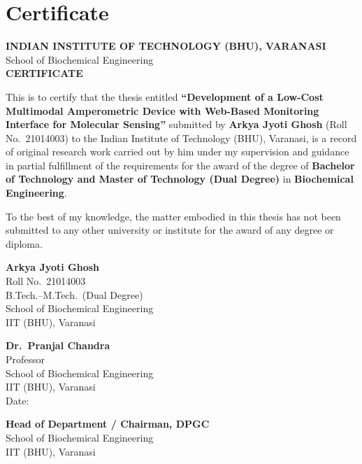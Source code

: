 \chapter*{Certificate}
\thispagestyle{plain}

\begin{center}
{\large \textbf{INDIAN INSTITUTE OF TECHNOLOGY (BHU), VARANASI}}\\[0.2cm]
{\normalsize School of Biochemical Engineering}\\[1.0cm]
{\Large \textbf{CERTIFICATE}}
\end{center}

\vspace{0.8cm}

This is to certify that the thesis entitled \textbf{``Development of a Low-Cost Multimodal Amperometric Device with Web-Based Monitoring Interface for Molecular Sensing''} submitted by \textbf{Arkya Jyoti Ghosh} (Roll No.\ 21014003) to the Indian Institute of Technology (BHU), Varanasi, is a record of original research work carried out by him under my supervision and guidance in partial fulfillment of the requirements for the award of the degree of \textbf{Bachelor of Technology and Master of Technology (Dual Degree)} in \textbf{Biochemical Engineering}.

\vspace{0.5cm}

To the best of my knowledge, the matter embodied in this thesis has not been submitted to any other university or institute for the award of any degree or diploma.

\vspace{2.5cm}

\noindent
\begin{minipage}[t]{0.45\textwidth}
\textbf{Arkya Jyoti Ghosh}\\
Roll No.\ 21014003\\
B.Tech.--M.Tech.\ (Dual Degree)\\
School of Biochemical Engineering\\
IIT (BHU), Varanasi
\end{minipage}
\hfill
\begin{minipage}[t]{0.45\textwidth}
\textbf{Dr.\ Pranjal Chandra}\\
Professor\\
School of Biochemical Engineering\\
IIT (BHU), Varanasi\\[1.0cm]
Date: \underline{\hspace{4cm}}
\end{minipage}

\vspace{2.0cm}

\noindent
\textbf{Head of Department / Chairman, DPGC}\\
School of Biochemical Engineering\\
IIT (BHU), Varanasi
